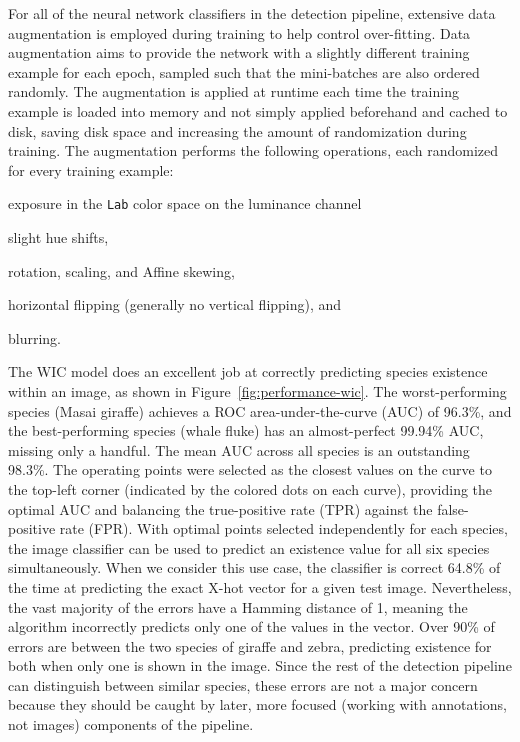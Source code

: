 For all of the neural network classifiers in the detection pipeline, extensive data augmentation is employed during training to help control over-fitting.  Data augmentation aims to provide the network with a slightly different training example for each epoch, sampled such that the mini-batches are also ordered randomly.  The augmentation is applied at runtime each time the training example is loaded into memory and not simply applied beforehand and cached to disk, saving disk space and increasing the amount of randomization during training.  The augmentation performs the following operations, each randomized for every training example:

\numsquishlist
\item exposure in the \texttt{Lab} color space on the luminance channel
\item slight hue shifts,
\item rotation, scaling, and Affine skewing,
\item horizontal flipping (generally no vertical flipping), and
\item blurring.
\numsquishend

The WIC model does an excellent job at correctly predicting species existence within an image, as shown in Figure~\ref{fig:performance-wic}.  The worst-performing species (Masai giraffe) achieves a ROC area-under-the-curve (AUC) of 96.3\%, and the best-performing species (whale fluke) has an almost-perfect 99.94\% AUC, missing only a handful.  The mean AUC across all species is an outstanding 98.3\%.  The operating points were selected as the closest values on the curve to the top-left corner (indicated by the colored dots on each curve), providing the optimal AUC and balancing the true-positive rate (TPR) against the false-positive rate (FPR).  With optimal points selected independently for each species, the image classifier can be used to predict an existence value for all six species simultaneously.  When we consider this use case, the classifier is correct 64.8\% of the time at predicting the exact X-hot vector for a given test image.  Nevertheless, the vast majority of the errors have a Hamming distance of 1, meaning the algorithm incorrectly predicts only one of the values in the vector.  Over 90\% of errors are between the two species of giraffe and zebra, predicting existence for both when only one is shown in the image.  Since the rest of the detection pipeline can distinguish between similar species, these errors are not a major concern because they should be caught by later, more focused (working with annotations, not images) components of the pipeline.

